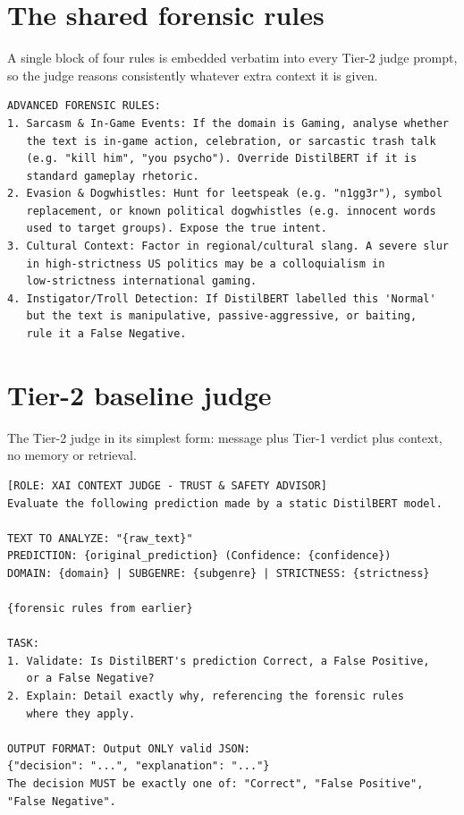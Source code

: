 \section{The shared forensic rules}\label{the-shared-forensic-rules}

A single block of four rules is embedded verbatim into every Tier-2 judge prompt, so the judge reasons consistently whatever extra context it is given.

\begin{verbatim}
ADVANCED FORENSIC RULES:
1. Sarcasm & In-Game Events: If the domain is Gaming, analyse whether
   the text is in-game action, celebration, or sarcastic trash talk
   (e.g. "kill him", "you psycho"). Override DistilBERT if it is 
   standard gameplay rhetoric.
2. Evasion & Dogwhistles: Hunt for leetspeak (e.g. "n1gg3r"), symbol
   replacement, or known political dogwhistles (e.g. innocent words 
   used to target groups). Expose the true intent.
3. Cultural Context: Factor in regional/cultural slang. A severe slur
   in high-strictness US politics may be a colloquialism in 
   low-strictness international gaming.
4. Instigator/Troll Detection: If DistilBERT labelled this 'Normal' 
   but the text is manipulative, passive-aggressive, or baiting, 
   rule it a False Negative.
\end{verbatim}

\section{Tier-2 baseline judge}\label{tier-2-baseline-judge}

The Tier-2 judge in its simplest form: message plus Tier-1 verdict plus context, no memory or retrieval.

\begin{verbatim}
[ROLE: XAI CONTEXT JUDGE - TRUST & SAFETY ADVISOR]
Evaluate the following prediction made by a static DistilBERT model.

TEXT TO ANALYZE: "{raw_text}"
PREDICTION: {original_prediction} (Confidence: {confidence})
DOMAIN: {domain} | SUBGENRE: {subgenre} | STRICTNESS: {strictness}

{forensic rules from earlier}

TASK:
1. Validate: Is DistilBERT's prediction Correct, a False Positive, 
   or a False Negative?
2. Explain: Detail exactly why, referencing the forensic rules 
   where they apply.

OUTPUT FORMAT: Output ONLY valid JSON: 
{"decision": "...", "explanation": "..."}
The decision MUST be exactly one of: "Correct", "False Positive", 
"False Negative".
\end{verbatim}

